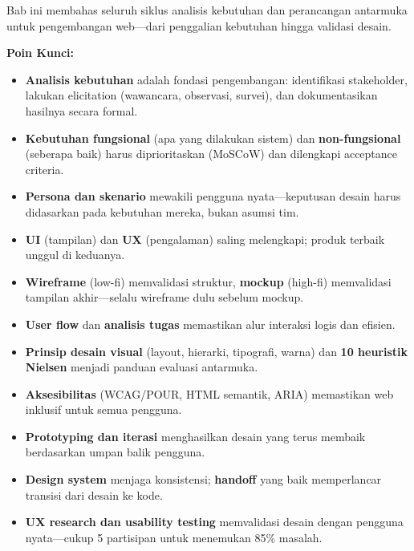 \documentclass[../main.tex]{subfiles}
\begin{document}
\begin{rangkuman}
Bab ini membahas seluruh siklus analisis kebutuhan dan perancangan antarmuka untuk pengembangan web---dari penggalian kebutuhan hingga validasi desain.

\textbf{Poin Kunci:}
\begin{itemize}
  \item \textbf{Analisis kebutuhan} adalah fondasi pengembangan: identifikasi stakeholder, lakukan elicitation (wawancara, observasi, survei), dan dokumentasikan hasilnya secara formal.
  \item \textbf{Kebutuhan fungsional} (apa yang dilakukan sistem) dan \textbf{non-fungsional} (seberapa baik) harus diprioritaskan (MoSCoW) dan dilengkapi acceptance criteria.
  \item \textbf{Persona dan skenario} mewakili pengguna nyata---keputusan desain harus didasarkan pada kebutuhan mereka, bukan asumsi tim.
  \item \textbf{UI} (tampilan) dan \textbf{UX} (pengalaman) saling melengkapi; produk terbaik unggul di keduanya.
  \item \textbf{Wireframe} (low-fi) memvalidasi struktur, \textbf{mockup} (high-fi) memvalidasi tampilan akhir---selalu wireframe dulu sebelum mockup.
  \item \textbf{User flow} dan \textbf{analisis tugas} memastikan alur interaksi logis dan efisien.
  \item \textbf{Prinsip desain visual} (layout, hierarki, tipografi, warna) dan \textbf{10 heuristik Nielsen} menjadi panduan evaluasi antarmuka.
  \item \textbf{Aksesibilitas} (WCAG/POUR, HTML semantik, ARIA) memastikan web inklusif untuk semua pengguna.
  \item \textbf{Prototyping dan iterasi} menghasilkan desain yang terus membaik berdasarkan umpan balik pengguna.
  \item \textbf{Design system} menjaga konsistensi; \textbf{handoff} yang baik memperlancar transisi dari desain ke kode.
  \item \textbf{UX research dan usability testing} memvalidasi desain dengan pengguna nyata---cukup 5 partisipan untuk menemukan 85\% masalah.
\end{itemize}
\end{rangkuman}

\ifSubfilesClassLoaded{
  \renewcommand{\bibname}{Daftar Pustaka}
  
  
}{}
\end{document}
